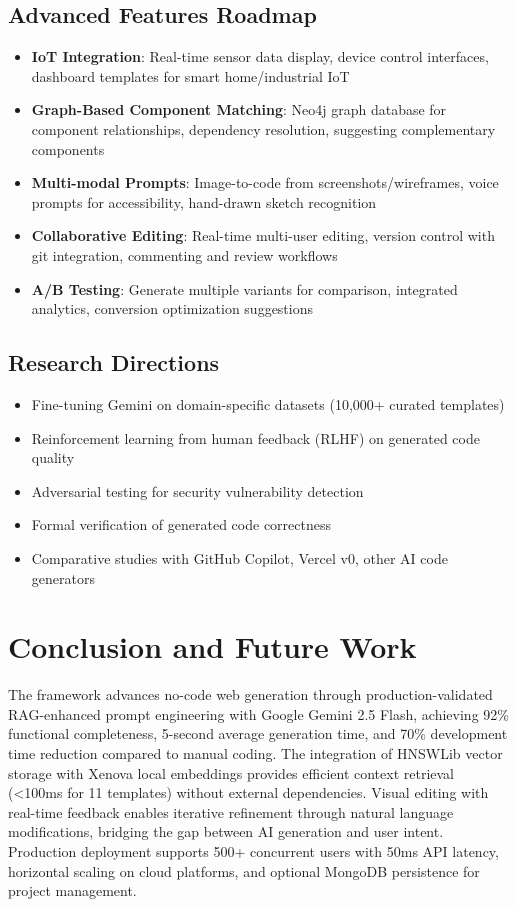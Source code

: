 \documentclass[10pt, conference, letterpaper]{IEEEtran}
\begin{document}
\subsection{Advanced Features Roadmap}
\begin{itemize}
    \item \textbf{IoT Integration}: Real-time sensor data display, device control interfaces, dashboard templates for smart home/industrial IoT
    \item \textbf{Graph-Based Component Matching}: Neo4j graph database for component relationships, dependency resolution, suggesting complementary components
    \item \textbf{Multi-modal Prompts}: Image-to-code from screenshots/wireframes, voice prompts for accessibility, hand-drawn sketch recognition
    \item \textbf{Collaborative Editing}: Real-time multi-user editing, version control with git integration, commenting and review workflows
    \item \textbf{A/B Testing}: Generate multiple variants for comparison, integrated analytics, conversion optimization suggestions
\end{itemize}

\subsection{Research Directions}
\begin{itemize}
    \item Fine-tuning Gemini on domain-specific datasets (10,000+ curated templates)
    \item Reinforcement learning from human feedback (RLHF) on generated code quality
    \item Adversarial testing for security vulnerability detection
    \item Formal verification of generated code correctness
    \item Comparative studies with GitHub Copilot, Vercel v0, other AI code generators
\end{itemize}

\section{Conclusion and Future Work}
The framework advances no-code web generation through production-validated RAG-enhanced prompt engineering with Google Gemini 2.5 Flash, achieving 92\% functional completeness, 5-second average generation time, and 70\% development time reduction compared to manual coding. The integration of HNSWLib vector storage with Xenova local embeddings provides efficient context retrieval (<100ms for 11 templates) without external dependencies. Visual editing with real-time feedback enables iterative refinement through natural language modifications, bridging the gap between AI generation and user intent. Production deployment supports 500+ concurrent users with 50ms API latency, horizontal scaling on cloud platforms, and optional MongoDB persistence for project management.
\end{document}
